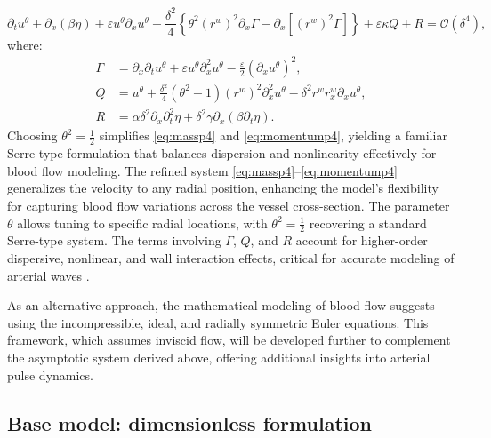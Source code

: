 \documentclass[alpha-refs, 12pt]{wiley-article}
\renewcommand{\O}{\mathcal{O}}
\newcommand{\eps}{\varepsilon}
\begin{document}
\begin{equation}\label{eq:momentump4}
  \partial_t u^\theta + \partial_x (\beta \eta) + \eps u^\theta \partial_x u^\theta + \frac{\delta^2}{4} \left\{ \theta^2 (r^w)^2 \partial_x \Gamma - \partial_x [(r^w)^2 \Gamma] \right\} + \eps \kappa Q + R = \O(\delta^4),
\end{equation}
where:
\begin{equation}\label{eq:gamman}
\begin{aligned}
  \Gamma &= \partial_x \partial_t u^\theta + \eps u^\theta \partial_x^2 u^\theta - \frac{\eps}{2} (\partial_x u^\theta)^2, \\
  Q &= u^\theta + \frac{\delta^2}{4} (\theta^2 - 1) (r^w)^2 \partial_x^2 u^\theta - \delta^2 r^w r^w_x \partial_x u^\theta, \\
  R &= \alpha \delta^2 \partial_x \partial_t^2 \eta + \delta^2 \gamma \partial_x (\beta \partial_t \eta).
\end{aligned}
\end{equation}
Choosing $\theta^2 = \frac{1}{2}$ simplifies \eqref{eq:massp4} and \eqref{eq:momentump4}, yielding a familiar Serre-type formulation that balances dispersion and nonlinearity effectively for blood flow modeling. The refined system \eqref{eq:massp4}--\eqref{eq:momentump4} generalizes the velocity to any radial position, enhancing the model's flexibility for capturing blood flow variations across the vessel cross-section. The parameter $\theta$ allows tuning to specific radial locations, with $\theta^2 = \frac{1}{2}$ recovering a standard Serre-type system. The terms involving $\Gamma$, $Q$, and $R$ account for higher-order dispersive, nonlinear, and wall interaction effects, critical for accurate modeling of arterial waves \cite{Mitsotakis2019}.

As an alternative approach, the mathematical modeling of blood flow suggests using the incompressible, ideal, and radially symmetric Euler equations. This framework, which assumes inviscid flow, will be developed further to complement the asymptotic system derived above, offering additional insights into arterial pulse dynamics.

\subsection{Base model: dimensionless formulation}
\end{document}

